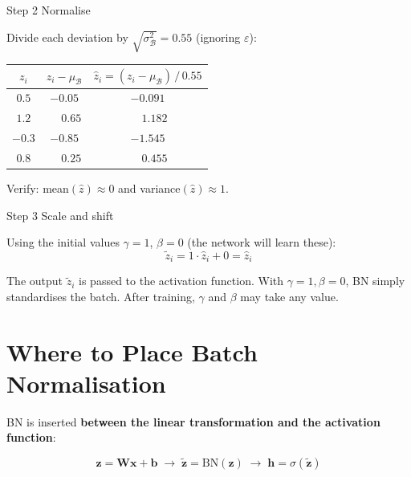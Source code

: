 \documentclass[12pt, a4paper]{article}
\newif\ifstudentmode
\newcommand{\sol}[2][6cm]{%
  \ifstudentmode\underline{\hspace{#1}}\else{#2}\fi}
\theoremstyle{definition}
\newcommand{\muB}{\mu_{\mathcal{B}}}
\newcommand{\sigB}{\sigma^2_{\mathcal{B}}}
\begin{document}
\begin{stepbox}{Step 2 \quad Normalise}

Divide each deviation by $\sqrt{\sigB} = 0.55$ (ignoring $\varepsilon$):

\begin{center}
\renewcommand{\arraystretch}{1.4}
\begin{tabular}{ccc}
\toprule
$z_i$ & $z_i - \muB$ & $\hat{z}_i = (z_i-\muB)\,/\,0.55$ \\
\midrule
$0.5$  & $-0.05$ & \sol[3cm]{$-0.091$} \\
$1.2$  & $\phantom{-}0.65$ & \sol[3cm]{$\phantom{-}1.182$} \\
$-0.3$ & $-0.85$ & \sol[3cm]{$-1.545$} \\
$0.8$  & $\phantom{-}0.25$ & \sol[3cm]{$\phantom{-}0.455$} \\
\bottomrule
\end{tabular}
\end{center}

Verify: mean$(\hat{z}) \approx 0$ and variance$(\hat{z}) \approx 1$. \checkmark
\end{stepbox}

\vspace{0.8em}

\begin{stepbox}{Step 3 \quad Scale and shift}

Using the initial values $\gamma = 1$, $\beta = 0$
(the network will learn these):
\[
  \tilde{z}_i = 1 \cdot \hat{z}_i + 0 = \hat{z}_i
\]

The output $\tilde{z}_i$ is passed to the activation function.  With
$\gamma = 1, \beta = 0$, BN simply standardises the batch.
After training, $\gamma$ and $\beta$ may take any value.
\end{stepbox}

\section{Where to Place Batch Normalisation}

BN is inserted \textbf{between the linear transformation and the activation
function}:

\[
  \mathbf{z} = \mathbf{W}\mathbf{x} + \mathbf{b}
  \;\longrightarrow\;
  \tilde{\mathbf{z}} = \text{BN}(\mathbf{z})
  \;\longrightarrow\;
  \mathbf{h} = \sigma(\tilde{\mathbf{z}})
\]
\end{document}
